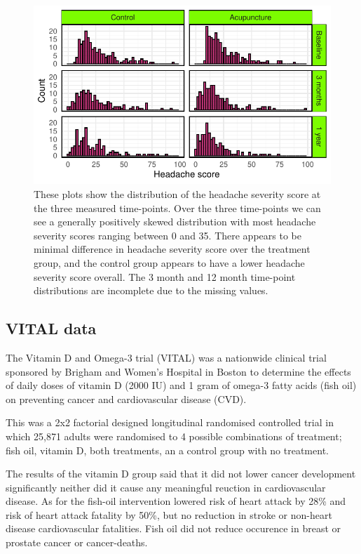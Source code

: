 \documentclass{article}
\begin{document}
\begin{figure}

{\centering \includegraphics{Final_Report_files/figure-latex/unnamed-chunk-11-1} 

}

\caption{These plots show the distribution of the headache severity score at the three measured time-points. Over the three time-points we can see a generally positively skewed distribution with most headache severity scores ranging between 0 and 35. There appears to be minimal difference in headache severity score over the treatment group, and the control group appears to have a lower headache severity score overall. The 3 month and 12 month time-point distributions are incomplete due to the missing values.}\label{fig:unnamed-chunk-11}
\end{figure}

\subsection{VITAL data}\label{vital-data}

The Vitamin D and Omega-3 trial (VITAL) was a nationwide clinical trial
sponsored by Brigham and Women's Hospital in Boston to determine the
effects of daily doses of vitamin D (2000 IU) and 1 gram of omega-3
fatty acids (fish oil) on preventing cancer and cardiovascular disease
(CVD).

This was a 2x2 factorial designed longitudinal randomised controlled
trial in which 25,871 adults were randomised to 4 possible combinations
of treatment; fish oil, vitamin D, both treatments, an a control group
with no treatment.

The results of the vitamin D group said that it did not lower cancer
development significantly neither did it cause any meaningful reuction
in cardiovascular disease. As for the fish-oil intervention lowered risk
of heart attack by 28\% and risk of heart attack fatality by 50\%, but
no reduction in stroke or non-heart disease cardiovascular fatalities.
Fish oil did not reduce occurence in breast or prostate cancer or
cancer-deaths.
\end{document}
